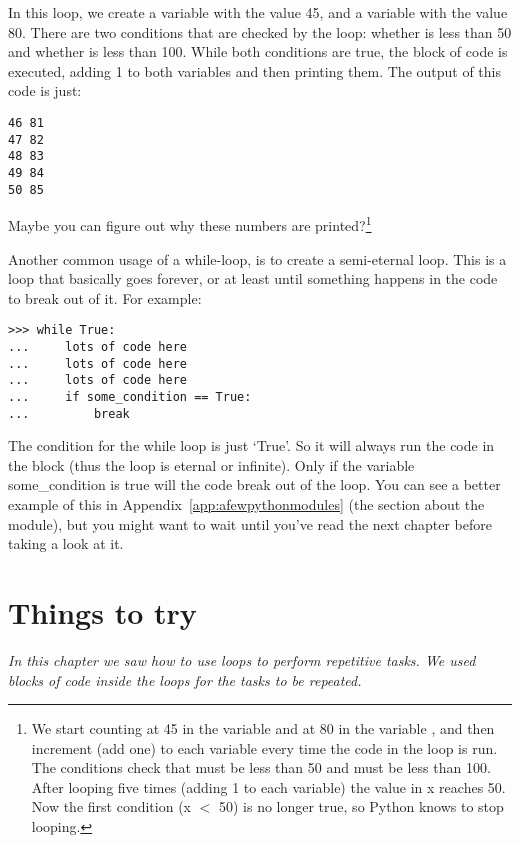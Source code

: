 In this loop, we create a variable  with the value 45, and a variable  with the value 80.  There are two conditions that are checked by the loop: whether  is less than 50 and whether  is less than 100. While both conditions are true, the block of code is executed, adding 1 to both variables and then printing them. The output of this code is just:

\begin{listing}
\begin{verbatim}
46 81
47 82
48 83
49 84
50 85
\end{verbatim}
\end{listing}

Maybe you can figure out why these numbers are printed?\footnote{We start counting at 45 in the variable  and at 80 in the variable , and then increment (add one) to each variable every time the code in the loop is run.  The conditions check that  must be less than 50 and  must be less than 100.  After looping five times (adding 1 to each variable) the value in x reaches 50.  Now the first condition (x $<$ 50) is no longer true, so Python knows to stop looping.}

Another common usage of a while-loop, is to create a semi-eternal loop. This is a loop that basically goes forever, or at least until something happens in the code to break out of it. For example:

\begin{listing}
\begin{verbatim}
>>> while True:
...     lots of code here
...     lots of code here
...     lots of code here
...     if some_condition == True:
...         break
\end{verbatim}
\end{listing}

The condition for the while loop is just `True'.  So it will always run the code in the block (thus the loop is eternal or infinite). Only if the variable some\_condition is true will the code break out of the loop.  You can see a better example of this in Appendix~\ref{app:afewpythonmodules} (the section about the  module), but you might want to wait until you've read the next chapter before taking a look at it.

\section{Things to try}

\emph{In this chapter we saw how to use loops to perform repetitive tasks.  We used blocks of code inside the loops for the tasks to be repeated.}

